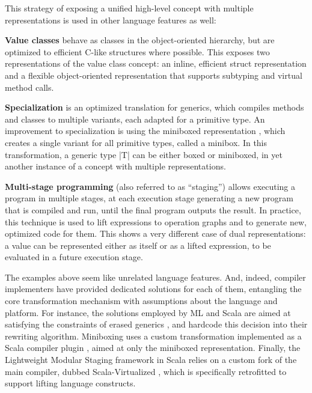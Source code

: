 This strategy of exposing a unified high-level concept with multiple representations is used in other language features as well:

\textbf{Value classes} \cite{gosling-value-classes, dot-net-value-types-www, scala-value-classes-sip} behave as classes in the object-oriented hierarchy, but are optimized to efficient C-like structures \cite{cxx-stroustrup} where possible. This exposes two representations of the value class concept: an inline, efficient struct representation and a flexible object-oriented representation that supports subtyping and virtual method calls.

\textbf{Specialization} \cite{specialization-iuli, iuli-thesis, goetz-specialization} is an optimized translation for generics, which compiles methods and classes to multiple variants, each adapted for a primitive type. An improvement to specialization is using the miniboxed representation \cite{miniboxing, miniboxing-www}, which creates a single variant for all primitive types, called a minibox. In this transformation, a generic type |T| can be either boxed or miniboxed, in yet another instance of a concept with multiple representations.

\textbf{Multi-stage programming} (also referred to as ``staging'') \cite{taha-intro} allows executing a program in multiple stages, at each execution stage generating a new program that is compiled and run, until the final program outputs the result. In practice, this technique is used to lift expressions to operation graphs and to generate new, optimized code for them. This shows a very different case of dual representations: a value can be represented either as itself or as a lifted expression, to be evaluated in a future execution stage.

The examples above seem like unrelated language features. And, indeed, compiler implementers have provided dedicated solutions for each of them, entangling the core transformation mechanism with assumptions about the language and platform. For instance, the solutions employed by ML and Scala are aimed at satisfying the constraints of erased generics \cite{java-erasure, leroy-unboxed-objects, thiemann-unboxed-objects-cps}, and hardcode this decision into their rewriting algorithm. Miniboxing uses a custom transformation implemented as a Scala compiler plugin \cite{miniboxing, miniboxing-www}, aimed at only the miniboxed representation. Finally, the Lightweight Modular Staging framework \cite{tiark-lms} in Scala relies on a custom fork of the main compiler, dubbed Scala-Virtualized \cite{scala-virtualized}, which is specifically retrofitted to support lifting language constructs.

